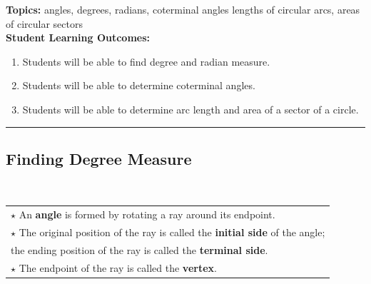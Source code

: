 

\noindent \textbf{Topics:}  angles, degrees, radians, coterminal angles lengths of circular arcs, areas of circular sectors\\

\noindent \textbf{Student Learning Outcomes:}
\begin{enumerate}
\item Students will be able to find degree and radian measure.
\item Students will be able to determine coterminal angles.
\item Students will be able to determine arc length and area of a sector of a circle.
\end{enumerate}

\hrule 

\bigskip

\subsection{Finding Degree Measure} ~

\begin{tabular}{| l |}\hline 
$\star$ An \textbf{angle} is formed by rotating a ray around its endpoint.\\
$\star$  The original position of the ray is called the \textbf{initial side} of the angle;\\ the ending position of the ray is called the \textbf{terminal side}.\\
$\star$  The endpoint of the ray is called the \textbf{vertex}.\\
\hline
\end{tabular}

